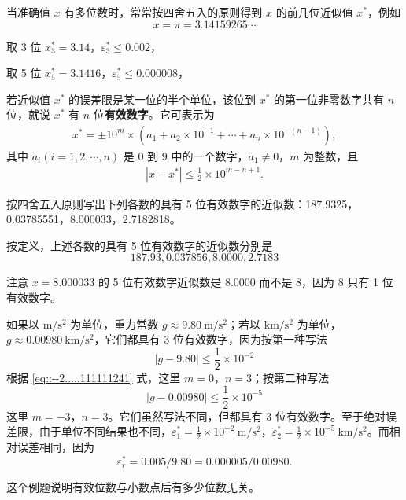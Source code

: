 \documentclass[../../main.tex]{subfiles}%
\begin{document}
\begin{example}
当准确值 $x$ 有多位数时，常常按四舍五入的原则得到 $x$ 的前几位近似值 $x^*$，例如 
\[
x = \pi = 3.14159265\cdots
\]

取 3 位  $x_3^* = 3.14$，$\varepsilon_3^* \leqslant 0.002$，

取 5 位  $x_5^* = 3.1416$，$\varepsilon_5^* \leqslant 0.000008$，
\end{example}

\begin{definition}[有效数字]
若近似值 $x^*$ 的误差限是某一位的半个单位，该位到 $x^*$ 的第一位非零数字共有 $n$ 位，就说 $x^*$ 有 $n$ 位\textbf{有效数字}。它可表示为 
\begin{align}
x^* = \pm 10^m \times (a_1 + a_2 \times 10^{-1} + \cdots + a_n \times 10^{-(n - 1)}),\label{eq::--2.....111111241}
\end{align}
其中 $a_i (i = 1, 2, \cdots, n)$ 是 0 到 9 中的一个数字，$a_1 \neq 0$，$m$ 为整数，且 
\begin{align}
| x - x^* | \leqslant \frac{1}{2} \times 10^{m - n + 1}.\label{eq::--2.....111111242}
\end{align}
\end{definition}

\begin{example}
按四舍五入原则写出下列各数的具有 5 位有效数字的近似数：187.9325，0.03785551，8.000033，2.7182818。
\end{example}
\begin{solution}
按定义，上述各数的具有 5 位有效数字的近似数分别是 
\[
187.93, 0.037856, 8.0000, 2.7183
\]

注意 $x = 8.000033$ 的 5 位有效数字近似数是 8.0000 而不是 8，因为 8 只有 1 位有效数字。

\end{solution}

\begin{example}
如果以 $\mathrm{m/s^2}$ 为单位，重力常数 $g \approx 9.80\ \mathrm{m/s^2}$；若以 $\mathrm{km/s^2}$ 为单位，$g \approx 0.00980\ \mathrm{km/s^2}$，它们都具有 3 位有效数字，因为按第一种写法 
\[
| g - 9.80 | \leqslant \frac{1}{2} \times 10^{-2}
\]
根据 \eqref{eq::--2.....111111241} 式，这里 $m = 0$，$n = 3$；按第二种写法 
\[
| g - 0.00980 | \leqslant \frac{1}{2} \times 10^{-5}
\]
这里 $m = -3$，$n = 3$。它们虽然写法不同，但都具有 3 位有效数字。至于绝对误差限，由于单位不同结果也不同，$\varepsilon_1^* = \frac{1}{2} \times 10^{-2}\ \mathrm{m/s^2}$，$\varepsilon_2^* = \frac{1}{2} \times 10^{-5}\ \mathrm{km/s^2}$。而相对误差相同，因为 
\[
\varepsilon_r^* = 0.005 / 9.80 = 0.000005 / 0.00980.
\]
\end{example}
\begin{note}
这个例题说明有效位数与小数点后有多少位数无关。
\end{note}
\end{document}
